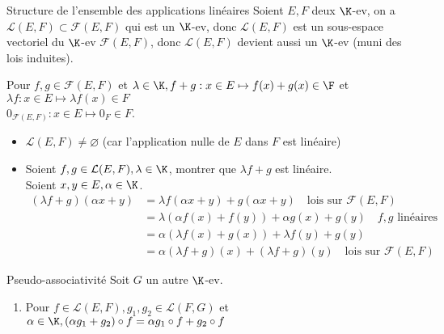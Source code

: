 \documentclass[12pt, a4paper]{report}
\begin{document}
\begin{remarque}{}

\begin{proposition}{Structure de l'ensemble des applications linéaires}{}
Soient $E,F$ deux $\K$-ev, on a $\mathcal{L}(E,F) \subset \mathcal{F}(E,F)$ qui est un $\K$-ev, donc $\mathcal{L}(E,F)$ est un sous-espace vectoriel du $\K$-ev $\mathcal{F}(E,F)$, donc $\mathcal{L}(E,F)$ devient aussi un $\K$-ev (muni des lois induites).
\end{proposition}

\begin{remarque}[Rappel]{}
Pour $f,g \in \mathcal{F}(E,F)$ et $\lambda \in \K, f+g : x \in E \mapsto f(x) + g(x) \in \F$ et $\lambda f : x \in E \mapsto \lambda f(x) \in F$ \\
$0_{\mathcal{F}(E,F)} : x \in E \mapsto 0_F \in F$.
\end{remarque}

\begin{demo}{}
\begin{itemize}
	\item $\mathcal{L}(E,F) \ne \varnothing$ (car l'application nulle de $E$ dans $F$ est linéaire)
	
	\item Soient $f,g \in \mathcal{L}(E,F), \lambda \in \K$, montrer que $\lambda f + g$ est linéaire. \\
	Soient $x,y \in E, \alpha \in \K$. \\
	\begin{align*}
	(\lambda f+g)(\alpha x + y) &= \lambda f(\alpha x + y) + g(\alpha x + y) \quad \text{lois sur } \mathcal{F}(E,F)  \\
	&= \lambda (\alpha f(x) + f(y)) + \alpha g(x) + g(y) \quad f,g \text{ linéaires} \\
	&= \alpha (\lambda f(x) + g(x)) + \lambda f(y) + g(y) \\
	&= \alpha (\lambda f+g)(x) + (\lambda f + g)(y) \quad \text{lois sur } \mathcal{F}(E,F)
	\end{align*}
\end{itemize}
\end{demo}

\begin{proposition}{Pseudo-associativité}{}
Soit $G$ un autre $\K$-ev.
\begin{enumerate}
	\item Pour $f \in \mathcal{L}(E,F), g_1,g_2 \in \mathcal{L}(F,G)$ et $\alpha \in \K, (\alpha g_1 + g_2) \circ f = \alpha g_1 \circ f + g_2 \circ f$
	

\end{enumerate}
\end{proposition}
\end{remarque}
\end{document}
